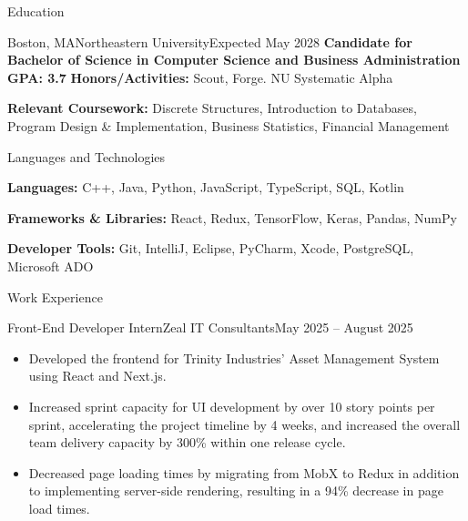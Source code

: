 \documentclass[]{mcdowellcv}
\begin{document}
	\makeheader
	\begin{cvsection}{Education}
		\begin{cvsubsection}{ Boston, MA}{Northeastern University}{Expected May 2028}
		\textbf{Candidate for Bachelor of Science in Computer Science and Business Administration \hfill{GPA: 3.7}}
		\textbf{Honors/Activities:} Scout, Forge. NU Systematic Alpha
		\vspace{-2mm}
			
		\textbf{Relevant Coursework:} Discrete Structures, Introduction to Databases, Program Design \& Implementation, Business Statistics, Financial Management
		\end{cvsubsection}
	\end{cvsection}
		\begin{cvsection}{Languages and Technologies}
		\begin{cvsubsection}{}{}{}	

\textbf{Languages:} C++, Java, Python, JavaScript, TypeScript, SQL, Kotlin
\vspace{-2mm}

\textbf{Frameworks \& Libraries:} React, Redux, TensorFlow, Keras, Pandas, NumPy
\vspace{-2mm}

\textbf{Developer Tools:} Git, IntelliJ, Eclipse, PyCharm, Xcode, PostgreSQL, Microsoft ADO
		\end{cvsubsection}
	\end{cvsection}
			\begin{cvsection}{Work Experience}
		\begin{cvsubsection}{Front-End Developer Intern}{Zeal IT Consultants}{May 2025 -- August 2025}			
			\begin{itemize}
				\item Developed the frontend for Trinity Industries' Asset Management System using React and Next.js.
				\smallskip
				\item Increased sprint capacity for UI development by over 10 story points per sprint, accelerating the project timeline by 4 weeks, and increased the overall team delivery capacity by 300\% within one release cycle.
				\smallskip
				\item Decreased page loading times by migrating from MobX to Redux in addition to implementing server-side rendering, resulting in a 94\% decrease in page load times.
			\end{itemize}
		\end{cvsubsection}
	\end{cvsection}
\end{document}
